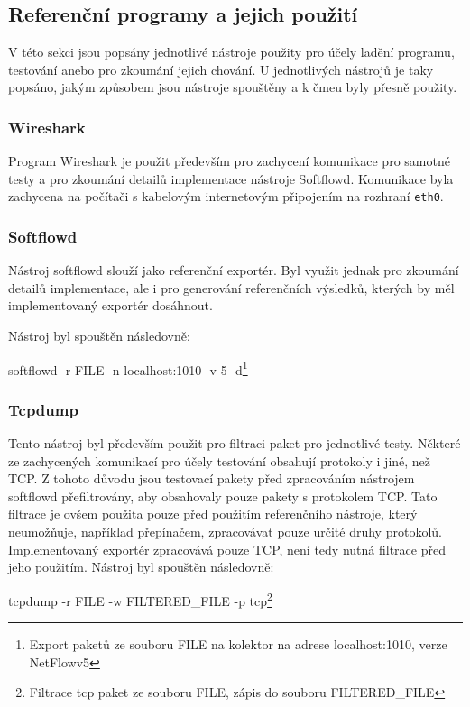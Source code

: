 \documentclass[11pt, a4paper, hidelinks]{article}[08.10.2023]
\begin{document}
    \subsection{Referenční programy a jejich použití}\label{refer_nastroje}
    V této sekci jsou popsány jednotlivé nástroje použity pro účely ladění programu, testování anebo pro zkoumání jejich chování. U jednotlivých nástrojů je taky popsáno, jakým způsobem jsou nástroje spouštěny a k čmeu byly přesně použity.
    \subsubsection{Wireshark}
    Program Wireshark je použit především pro zachycení komunikace pro samotné testy a pro zkoumání detailů implementace nástroje Softflowd. Komunikace byla zachycena na počítači s kabelovým internetovým připojením na rozhraní \texttt{eth0}.
    \subsubsection{Softflowd}
    Nástroj softflowd slouží jako referenční exportér. Byl využit jednak pro zkoumání detailů implementace, ale i pro generování referenčních výsledků, kterých by měl implementovaný exportér dosáhnout.

    Nástroj byl spouštěn následovně:
    \begin{center}
        softflowd -r FILE -n localhost:1010 -v 5 -d\footnote{Export paketů ze souboru FILE na kolektor na adrese localhost:1010, verze NetFlowv5}
    \end{center}

    \subsubsection{Tcpdump}
    Tento nástroj byl především použit pro filtraci paket pro jednotlivé testy. Některé ze zachycených komunikací pro účely testování obsahují protokoly i jiné, než TCP. Z tohoto důvodu jsou testovací pakety před zpracováním nástrojem softflowd přefiltrovány, aby obsahovaly pouze pakety s protokolem TCP. Tato filtrace je ovšem použita pouze před použitím referenčního nástroje, který neumožňuje, například přepínačem, zpracovávat pouze určité druhy protokolů. Implementovaný exportér zpracovává pouze TCP, není tedy nutná filtrace před jeho použitím.
    Nástroj byl spouštěn následovně:

    \begin{center}
        tcpdump -r FILE -w FILTERED\_FILE -p tcp\footnote{Filtrace tcp paket ze souboru FILE, zápis do souboru FILTERED\_FILE}
    \end{center}
\end{document}
